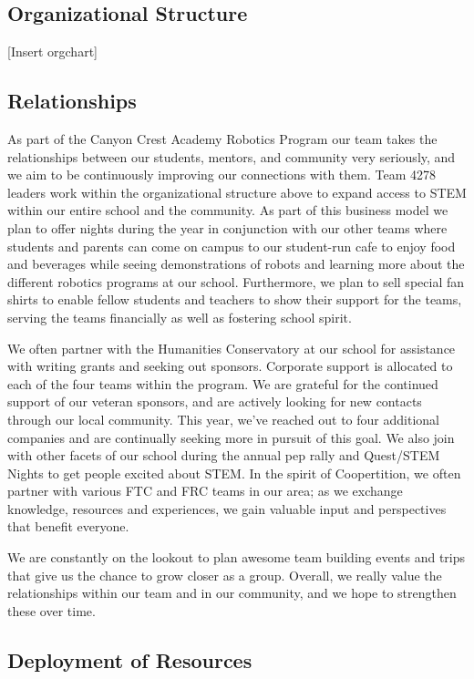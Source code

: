 \subsection{Organizational Structure}

[Insert orgchart]

\subsection{Relationships}

As part of the Canyon Crest Academy Robotics Program our team takes the relationships between our students, mentors, and community very seriously, and we aim to be continuously improving our connections with them. Team 4278 leaders work within the organizational structure above to expand access to STEM within our entire school and the community. As part of this business model we plan to offer nights during the year in conjunction with our other teams where students and parents can come on campus to our student-run cafe to enjoy food and beverages while seeing demonstrations of robots and learning more about the different robotics programs at our school. Furthermore, we plan to sell special fan shirts to enable fellow students and teachers to show their support for the teams, serving the teams financially as well as fostering school spirit. 

We often partner with the Humanities Conservatory at our school for assistance with writing grants and seeking out sponsors. Corporate support is allocated to each of the four teams within the program. We are grateful for the continued support of our veteran sponsors, and are actively looking for new contacts through our local community. This year, we’ve reached out to four additional companies and are continually seeking more in pursuit of this goal. We also join with other facets of our school during the annual pep rally and Quest/STEM Nights to get people excited about STEM. In the spirit of Coopertition, we often partner with various FTC and FRC teams in our area; as we exchange knowledge, resources and experiences, we gain valuable input and perspectives that benefit everyone. 

We are constantly on the lookout to plan awesome team building events and trips that give us the chance to grow closer as a group. Overall, we really value the relationships within our team and in our community, and we hope to strengthen these over time. 

\subsection{Deployment of Resources}

